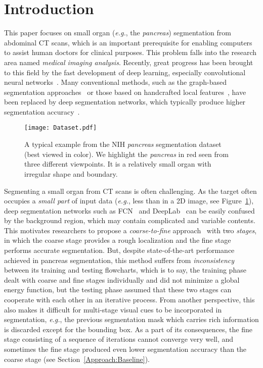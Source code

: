 \documentclass[10pt,twocolumn,letterpaper]{article}
\begin{document}
\section{Introduction}
\label{Introduction}

This paper focuses on small organ ({\em e.g.}, the {\em pancreas}) segmentation from abdominal CT scans,
which is an important prerequisite for enabling computers to assist human doctors for clinical purposes.
This problem falls into the research area named {\em medical imaging analysis}.
Recently, great progress has been brought to this field by the fast development of deep learning,
especially convolutional neural networks~\cite{Krizhevsky_2012_ImageNet}\cite{Long_2015_Fully}.
Many conventional methods, such as the graph-based segmentation approaches~\cite{Ali_2007_Graph}
or those based on handcrafted local features~\cite{Wang_2014_Geodesic},
have been replaced by deep segmentation networks,
which typically produce higher segmentation accuracy~\cite{Ronneberger_2015_UNet}\cite{Roth_2015_DeepOrgan}.

\newcommand{\figurewidth}{7.0cm}
\begin{figure}[t]
\begin{center}
    \texttt{[image: Dataset.pdf]}
\end{center}
\caption{
    A typical example from the NIH {\em pancreas} segmentation dataset~\cite{Roth_2015_DeepOrgan} (best viewed in color).
    We highlight the {\em pancreas} in red seen from three different viewpoints.
    It is a relatively small organ with irregular shape and boundary.
}
\label{Fig:Dataset}
\end{figure}

Segmenting a small organ from CT scans is often challenging.
As the target often occupies a {\em small part} of input data
({\em e.g.}, less than  in a 2D image, see Figure~\ref{Fig:Dataset}),
deep segmentation networks such as FCN~\cite{Long_2015_Fully} and DeepLab~\cite{Chen_2015_Semantic}
can be easily confused by the background region, which may contain complicated and variable contents.
This motivates researchers to propose a {\em coarse-to-fine} approach~\cite{Zhou_2017_Fixed} with two {\em stages},
in which the coarse stage provides a rough localization and the fine stage performs accurate segmentation.
But, despite state-of-the-art performance achieved in pancreas segmentation,
this method suffers from {\em inconsistency} between its training and testing flowcharts,
which is to say, the training phase dealt with coarse and fine stages individually and did not minimize a global energy function,
but the testing phase assumed that these two stages can cooperate with each other in an iterative process.
From another perspective, this also makes it difficult for multi-stage visual cues to be incorporated in segmentation,
{\em e.g.}, the previous segmentation mask which carries rich information is discarded except for the bounding box.
As a part of its consequences, the fine stage consisting of a sequence of iterations cannot converge very well,
and sometimes the fine stage produced even lower segmentation accuracy than the coarse stage (see Section~\ref{Approach:Baseline}).
\end{document}
